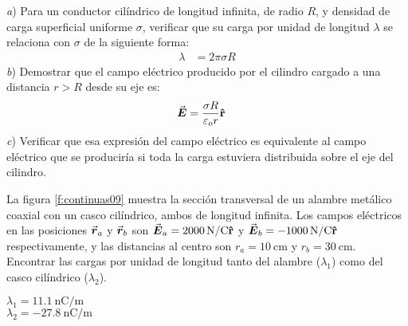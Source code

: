 %
\begin{Exercise}
  \textbf{\raisebox{.5pt}{\textcircled{\raisebox{-1.2pt} {E}}}} \textit{a}) Para un conductor cilíndrico de longitud infinita, de radio $R$, y densidad de carga superficial uniforme $\sigma$, verificar que su carga por unidad de longitud $\lambda$ se relaciona con $\sigma$ de la siguiente forma:
  \begin{align*}
    \lambda &= 2\pi\sigma R
  \end{align*}
  \textit{b}) Demostrar que el campo eléctrico producido por el cilindro cargado a una distancia $r > R$ desde su eje es:
  \begin{align*}
    \va*{E} &= \frac{\sigma R}{\varepsilon_o r}\vu{r}
  \end{align*}
  \textit{c}) Verificar que esa expresión del campo eléctrico es equivalente al campo eléctrico que se produciría si toda la carga estuviera distribuida sobre el eje del cilindro.
\end{Exercise}
%
\begin{Exercise}\label{p:continuas09}
  La figura \ref{f:continuas09} muestra la sección transversal de un alambre metálico coaxial con un casco cilíndrico, ambos de longitud infinita. Los campos eléctricos en las posiciones $\va*{r}_a$ y $\va*{r}_b$ son $\va*{E}_a = \SI{2000}{\newton/\coulomb}\vu{r}$ y $\va*{E}_b = \SI{-1000}{\newton/\coulomb}\vu{r}$ respectivamente, y las distancias al centro son $r_a = \SI{10}{\centi\metre}$ y $r_b = \SI{30}{\centi\metre}$. Encontrar las cargas por unidad de longitud tanto del alambre ($\lambda_1$) como del casco cilíndrico ($\lambda_2$).
\end{Exercise}
\begin{Answer}
  \begin{minipage}[t]{.4\textwidth}
    $\lambda_1 = \SI{11.1}{\nano\coulomb/\metre}$\\ $\lambda_2 = \SI{-27.8}{\nano\coulomb/\metre}$
  \end{minipage}
\end{Answer}
%
\begin{center}
\end{center}
